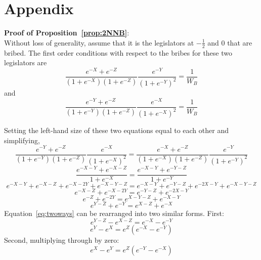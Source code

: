 \documentclass[12pt]{article}
\begin{document}
\section*{Appendix}
\label{sec:app}
\noindent \textbf{\hypertarget{Pr_2NNB}{Proof of Proposition~\ref{prop:2NNB}}}: \\
Without loss of generality, assume that it is the legislators at $-\frac{1}{2}$ and $0$ that are bribed. The first order conditions with respect to the bribes for these two legislators are
	\begin{equation}
		\frac{e^{-X} + e^{-Z}}{\left(1+e^{-X}\right)\left(1+e^{-Z}\right)} \frac{e^{-Y}}{\left(1+e^{-Y}\right)^2}= \frac{1}{W_B}
	\end{equation}
	and
	\begin{equation}
		\frac{e^{-Y} + e^{-Z}}{\left(1+e^{-Y}\right)\left(1+e^{-Z}\right)} \frac{e^{-X}}{\left(1+e^{-X}\right)^2}= \frac{1}{W_B}
		\label{eq:base}
	\end{equation}
		
		Setting the left-hand size of these two equations equal to each other and simplifying,
		\[
		  \frac{e^{-Y} + e^{-Z}}{\left(1+e^{-Y}\right)\left(1+e^{-Z}\right)} \frac{e^{-X}}{\left(1+e^{-X}\right)^2}= \frac{e^{-X} + e^{-Z}}{\left(1+e^{-X}\right)\left(1+e^{-Z}\right)} \frac{e^{-Y}}{\left(1+e^{-Y}\right)^2}
		\]
		\[
		  \frac{e^{-X-Y} + e^{-X-Z}}{1+e^{-X}}= \frac{e^{-X-Y} + e^{-Y-Z}}{1+e^{-Y}}
		\]
		\[
		  e^{-X-Y} + e^{-X-Z} + e^{-X-2Y} +e^{-X-Y-Z}= e^{-X-Y} + e^{-Y-Z} + e^{-2X-Y} +e^{-X-Y-Z}
		\]
		\[
		  e^{-X-Z} +e^{-X-2Y}= e^{-Y-Z} +e^{-2X-Y}
		\]
		\[
		  e^{-Z} +e^{-2Y}= e^{X-Y-Z} +e^{-X-Y}
		\]
		\begin{equation}
		  e^{Y-Z} +e^{-Y}= e^{X-Z} +e^{-X}
			\label{eq:twoways}
		\end{equation}
   Equation~\ref{eq:twoways} can be rearranged into two similar forms. First:
		\[
		  e^{Y-Z} - e^{X-Z}= e^{-X} - e^{-Y}
		\]
		\begin{equation}
		  e^{Y} - e^{X}= e^Z\left(e^{-X} - e^{-Y}\right)
			\label{eq:1}
		\end{equation}
  	Second, multiplying through by zero:
	  \begin{equation}
		  e^{X} - e^{Y}= e^Z\left(e^{-Y} - e^{-X}\right)
			\label{eq:2}
		\end{equation}
		
\end{document}
